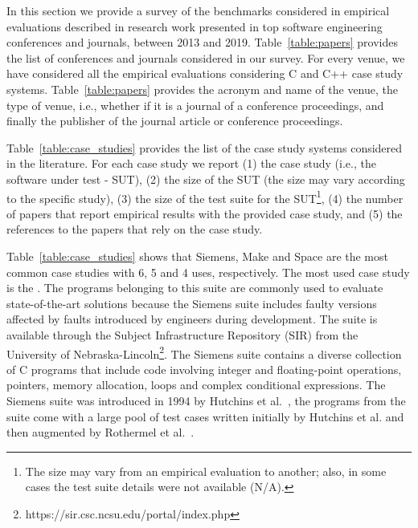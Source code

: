


In this section we provide a survey of the benchmarks considered in empirical evaluations described in research work presented in top software engineering conferences and journals, between 2013 and 2019. Table~\ref{table:papers} provides the list of conferences and journals considered in our survey. For every venue, we have considered all the empirical evaluations considering C and C++ case study systems. Table~\ref{table:papers} provides the acronym and name of the venue, the type of venue, i.e., whether if it is a journal of a conference proceedings, and finally the publisher of the journal article or conference proceedings. 





Table~\ref{table:case_studies} provides the list of the case study systems considered in the literature. For each case study we report (1) the case study (i.e., the software under test - SUT), (2) the size of the SUT (the size may vary according to the specific study), (3) the size of the test suite for the SUT\footnote{The size may vary from an empirical evaluation to another; also, in some cases the test suite details were not available (N/A).}, (4) the number of papers that report empirical results with the provided case study, and (5) the references to the papers that rely on the case study.


Table~\ref{table:case_studies} shows that Siemens, Make and Space are the most common case studies with 6, 5 and 4 uses, respectively. 
The most used case study is the . The programs belonging to this suite are commonly used to evaluate state-of-the-art solutions because the Siemens suite includes faulty versions affected by faults introduced by engineers during development. The suite is available through the Subject Infrastructure Repository (SIR) from the University of Nebraska-Lincoln\footnote{https://sir.csc.ncsu.edu/portal/index.php}. The Siemens suite contains a diverse collection of C programs that include code involving integer and floating-point operations, pointers, memory allocation, loops and complex conditional expressions. The Siemens suite was introduced in 1994 by Hutchins et al.~\cite{hutchins1994experiments}, the programs from the suite come with a large pool of test cases written initially by Hutchins et al. and then augmented by Rothermel et al.~\cite{rothermel1998empirical}.

